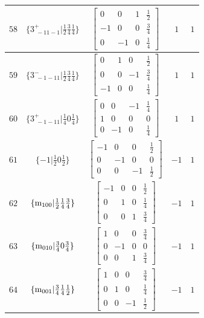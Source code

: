 \documentclass[fleqn,8pt]{jsarticle}
\begin{document}
\begin{longtable}{ccccc}
$ 58 $ & $ \{3^{+}_{\,\,-11-1}|\frac{1}{2} \frac{3}{4} \frac{1}{4}\} $ & $ \begin{bmatrix} 0 & 0 & 1 & \frac{1}{2} \\ -1 & 0 & 0 & \frac{3}{4} \\ 0 & -1 & 0 & \frac{1}{4} \end{bmatrix} $ & $ 1 $ & $ 1 $ \\ \hline
$ 59 $ & $ \{3^{-}_{\,\,-1-11}|\frac{1}{2} \frac{3}{4} \frac{1}{4}\} $ & $ \begin{bmatrix} 0 & 1 & 0 & \frac{1}{2} \\ 0 & 0 & -1 & \frac{3}{4} \\ -1 & 0 & 0 & \frac{1}{4} \end{bmatrix} $ & $ 1 $ & $ 1 $ \\ \hline
$ 60 $ & $ \{3^{+}_{\,\,-1-11}|\frac{1}{4} 0 \frac{1}{4}\} $ & $ \begin{bmatrix} 0 & 0 & -1 & \frac{1}{4} \\ 1 & 0 & 0 & 0 \\ 0 & -1 & 0 & \frac{1}{4} \end{bmatrix} $ & $ 1 $ & $ 1 $ \\ \hline
$ 61 $ & $ \{-1|\frac{1}{2} 0 \frac{1}{2}\} $ & $ \begin{bmatrix} -1 & 0 & 0 & \frac{1}{2} \\ 0 & -1 & 0 & 0 \\ 0 & 0 & -1 & \frac{1}{2} \end{bmatrix} $ & $ -1 $ & $ 1 $ \\ \hline
$ 62 $ & $ \{{\rm m}_{100}|\frac{1}{2} \frac{1}{4} \frac{3}{4}\} $ & $ \begin{bmatrix} -1 & 0 & 0 & \frac{1}{2} \\ 0 & 1 & 0 & \frac{1}{4} \\ 0 & 0 & 1 & \frac{3}{4} \end{bmatrix} $ & $ -1 $ & $ 1 $ \\ \hline
$ 63 $ & $ \{{\rm m}_{010}|\frac{3}{4} 0 \frac{3}{4}\} $ & $ \begin{bmatrix} 1 & 0 & 0 & \frac{3}{4} \\ 0 & -1 & 0 & 0 \\ 0 & 0 & 1 & \frac{3}{4} \end{bmatrix} $ & $ -1 $ & $ 1 $ \\ \hline
$ 64 $ & $ \{{\rm m}_{001}|\frac{3}{4} \frac{1}{4} \frac{1}{2}\} $ & $ \begin{bmatrix} 1 & 0 & 0 & \frac{3}{4} \\ 0 & 1 & 0 & \frac{1}{4} \\ 0 & 0 & -1 & \frac{1}{2} \end{bmatrix} $ & $ -1 $ & $ 1 $ \\ \hline

\end{longtable}
\end{document}
